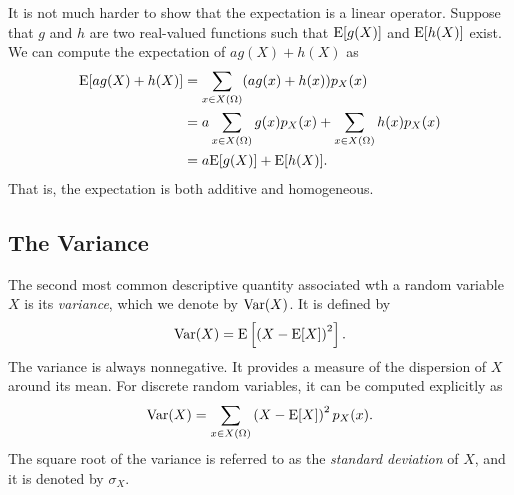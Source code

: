 It is not much harder to show that the expectation is a linear operator.
Suppose that $g$ and $h$ are two real-valued functions such that $\mathrm{E} [g(X)]$ and $\mathrm{E} [h(X)]$ exist.
We can compute the expectation of $a g(X) + h(X)$ as
\begin{equation*}
\begin{split}
\mathrm{E} [ a g(X) + h(X) ] &= \sum_{x \in X(\Omega)} (a g(x) + h(x)) p_X(x) \\
&= a \sum_{x \in X(\Omega)} g(x) p_X(x) + \sum_{x \in X(\Omega)} h(x) p_X(x) \\
&= a \mathrm{E} [g(X)] + \mathrm{E} [h(X)] .
\end{split}
\end{equation*}
That is, the expectation is both additive and homogeneous.


\subsection{The Variance}

The second most common descriptive quantity associated wth a random variable $X$ is its \emph{variance}, which we denote by $\mathrm{Var} (X)$.
It is defined by
\begin{equation} \label{equation:Variance}
\mathrm{Var} (X) = \mathrm{E} \left[ \left( X - \mathrm{E} [X] \right)^2 \right] .
\end{equation}
The variance is always nonnegative.
It provides a measure of the dispersion of $X$ around its mean.
For discrete random variables, it can be computed explicitly as
\begin{equation*}
\mathrm{Var} (X) = \sum_{x \in X(\Omega)} \left( X - \mathrm{E} [X] \right)^2 p_X (x) .
\end{equation*}
The square root of the variance is referred to as the \emph{standard deviation} of $X$, and it is denoted by $\sigma_X$.

